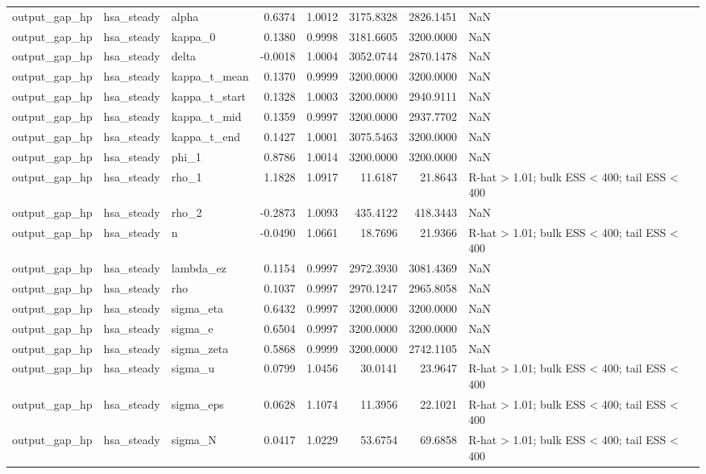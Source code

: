 \begin{tabular}{lllrrrrl}
output\_gap\_hp & hsa\_steady & alpha & 0.6374 & 1.0012 & 3175.8328 & 2826.1451 & NaN \\
output\_gap\_hp & hsa\_steady & kappa\_0 & 0.1380 & 0.9998 & 3181.6605 & 3200.0000 & NaN \\
output\_gap\_hp & hsa\_steady & delta & -0.0018 & 1.0004 & 3052.0744 & 2870.1478 & NaN \\
output\_gap\_hp & hsa\_steady & kappa\_t\_mean & 0.1370 & 0.9999 & 3200.0000 & 3200.0000 & NaN \\
output\_gap\_hp & hsa\_steady & kappa\_t\_start & 0.1328 & 1.0003 & 3200.0000 & 2940.9111 & NaN \\
output\_gap\_hp & hsa\_steady & kappa\_t\_mid & 0.1359 & 0.9997 & 3200.0000 & 2937.7702 & NaN \\
output\_gap\_hp & hsa\_steady & kappa\_t\_end & 0.1427 & 1.0001 & 3075.5463 & 3200.0000 & NaN \\
output\_gap\_hp & hsa\_steady & phi\_1 & 0.8786 & 1.0014 & 3200.0000 & 3200.0000 & NaN \\
output\_gap\_hp & hsa\_steady & rho\_1 & 1.1828 & 1.0917 & 11.6187 & 21.8643 & R-hat > 1.01; bulk ESS < 400; tail ESS < 400 \\
output\_gap\_hp & hsa\_steady & rho\_2 & -0.2873 & 1.0093 & 435.4122 & 418.3443 & NaN \\
output\_gap\_hp & hsa\_steady & n & -0.0490 & 1.0661 & 18.7696 & 21.9366 & R-hat > 1.01; bulk ESS < 400; tail ESS < 400 \\
output\_gap\_hp & hsa\_steady & lambda\_ez & 0.1154 & 0.9997 & 2972.3930 & 3081.4369 & NaN \\
output\_gap\_hp & hsa\_steady & rho & 0.1037 & 0.9997 & 2970.1247 & 2965.8058 & NaN \\
output\_gap\_hp & hsa\_steady & sigma\_eta & 0.6432 & 0.9997 & 3200.0000 & 3200.0000 & NaN \\
output\_gap\_hp & hsa\_steady & sigma\_e & 0.6504 & 0.9997 & 3200.0000 & 3200.0000 & NaN \\
output\_gap\_hp & hsa\_steady & sigma\_zeta & 0.5868 & 0.9999 & 3200.0000 & 2742.1105 & NaN \\
output\_gap\_hp & hsa\_steady & sigma\_u & 0.0799 & 1.0456 & 30.0141 & 23.9647 & R-hat > 1.01; bulk ESS < 400; tail ESS < 400 \\
output\_gap\_hp & hsa\_steady & sigma\_eps & 0.0628 & 1.1074 & 11.3956 & 22.1021 & R-hat > 1.01; bulk ESS < 400; tail ESS < 400 \\
output\_gap\_hp & hsa\_steady & sigma\_N & 0.0417 & 1.0229 & 53.6754 & 69.6858 & R-hat > 1.01; bulk ESS < 400; tail ESS < 400 \\

\end{tabular}
